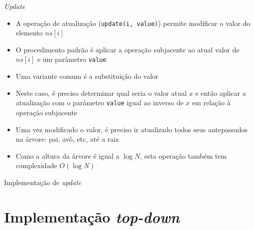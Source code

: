 \begin{frame}[fragile]{\it Update}

    \begin{itemize}
        \item A operação de atualização (\texttt{update(i, value)}) permite modificar o valor do
            elemento $ns[i]$

        \item O procedimento padrão é aplicar a operação subjacente ao atual valor de $ns[i]$
            e um parâmetro \texttt{value}

        \item Uma variante comum é a substituição do valor

        \item Neste caso, é preciso determinar qual seria o valor atual $x$ e então aplicar a
            atualização com o parâmetro \texttt{value} igual ao inverso de $x$ em relação à
            operação subjacente

        \item Uma vez modificado o valor, é preciso ir atualizado todos seus antepassados na
            árvore: pai, avô, etc, até a raiz

        \item Como a altura da árvore é igual a $\log N$, esta operação também tem complexidade
            $O(\log N)$
    \end{itemize}

\end{frame}




\begin{frame}[fragile]{Implementação de {\it update}}
\end{frame}

\section{Implementação {\it top-down}}

